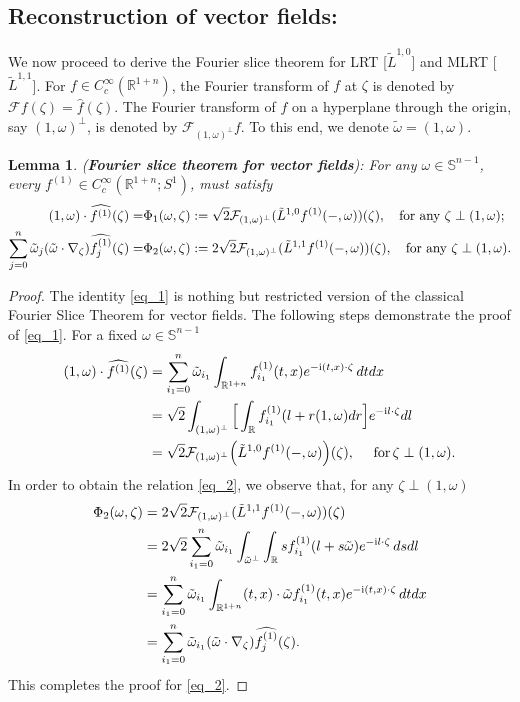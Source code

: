 \documentclass[11pt,a4paper,reqno]{amsart}
\newtheorem{lemma}[definition]{Lemma}
\renewcommand{\i}{\mathrm{i}}
\newcommand{\R}{\mathbb{R}}
\renewcommand{\S}{\mathbb{S}}
\newcommand{\F}{\mathcal{F}}
\newcommand{\om}{\omega}
\newcommand{\sn}{\mathbb{S}^{n-1}}
\begin{document}
	\subsection{Reconstruction of vector fields:}
	We now proceed to derive the Fourier slice theorem for LRT [$\tilde{L}^{1,0}$] and MLRT [$\tilde{L}^{1,1}$]. For $f \in C_{c}^{\infty}(\mathbb{R}^{1+n})$, the Fourier transform of $f$ at $\zeta$ is denoted by $\F f(\zeta)=\hat{f}(\zeta)$. The Fourier transform of $f$ on a hyperplane through the origin, say $(1,\om)^{\perp}$, is denoted by $\F_{(1,\om)^{\perp}}f$. To this end, we denote  $\tilde{\omega}=(1,\omega)$. 
	\begin{lemma}{(\textbf{Fourier slice theorem for vector fields}):}
		For any $\om \in \sn$, every $f^{(1)}\in C_{c}^{\infty}(\R^{1+n};S^{1})$, must satisfy
		\begin{eqnarray}
			(1,\omega)\cdot \widehat{f^{(1)}}(\zeta)
			=&\Phi_{1}(\omega,\zeta)
            :=\sqrt{2}\mathcal{F}_{(1,\omega)^{\perp}}(\Tilde{L}^{1,0}f^{(1)}(-,\omega))(\zeta), 
			\quad \mbox{for any } \zeta \perp (1,\omega );  \label{eq_1}\\
			\sum_{j=0}^{n}\Tilde{\omega}_{j}(\tilde{\om}\cdot \nabla_{\zeta})\widehat{f^{(1)}_j}(\zeta)
			=&\Phi_{2}(\omega, \zeta)
			:=2\sqrt{2}\mathcal{F}_{(1,\omega)^{\perp}}(\Tilde{L}^{1,1}f^{(1)}(-,\omega))(\zeta), \quad \mbox{for any } \zeta \perp (1,\omega ).  \label{eq_2}
		\end{eqnarray}
	\end{lemma}
	\begin{proof}
		The identity \eqref{eq_1} is nothing but restricted version of the classical Fourier Slice Theorem for vector fields. The following steps demonstrate the proof of \eqref{eq_1}. For a  fixed $\om \in \S^{n-1}$ 
		\[
		\begin{aligned}
			(1,\om)\cdot \widehat{f^{(1)}}(\zeta)&=\sum_{i_1=0}^{n}\Tilde{\om}_{i_1}\int_{\R^{1+n}}f^{(1)}_{i_1}(t,x)e^{-\i  (t,x)\cdot \zeta }\, dtdx\\
			&=\sqrt{2}\int_{(1,\om)^{\perp}}\Big[\int_{\R}f^{(1)}_{i_1}(l+r(1,\om)dr \Big]e^{-\i l\cdot \zeta}dl\\
			&= \sqrt{2}\mathcal{F}_{(1,\om)^{\perp}}\Big(\tilde{L}^{1,0}f^{(1)}(-,\om)\Big)(\zeta), \quad \text{ for}\, \zeta \perp (1,\om).
		\end{aligned}
		\]
	In order to obtain the relation \eqref{eq_2},  we observe that, for any $\zeta \perp (1,\omega )$
		\[
		\begin{aligned}
			\Phi_{2}(\omega, \zeta) &= 2\sqrt{2}\mathcal{F}_{(1,\omega)^{\perp}}(\Tilde{L}^{1,1}f^{(1)}(-,\omega))(\zeta) \\
			&=2\sqrt{2}\sum_{i_1=0}^n\tilde{\om}_{i_1}\int_{\tilde{\om}^{\perp}}\int_{\R}sf^{(1)}_{i_1}(l+s\tilde{\om})e^{-\i l\cdot \zeta}\,dsdl\\
			&=\sum_{i_1=0}^n\tilde{\om}_{i_1}\int_{\R^{1+n}}(t,x)\cdot \tilde{\om}f^{(1)}_{i_1}(t,x)e^{-\i (t,x)\cdot \zeta}\, dtdx\\
			&=\sum_{i_1=0}^{n}\Tilde{\omega}_{i_1}(\tilde{\om}\cdot \nabla_{\zeta})\widehat{f^{(1)}_j}(\zeta).
		\end{aligned}
		\]
		This completes the proof for \eqref{eq_2}.
	\end{proof}
	
\end{document}
